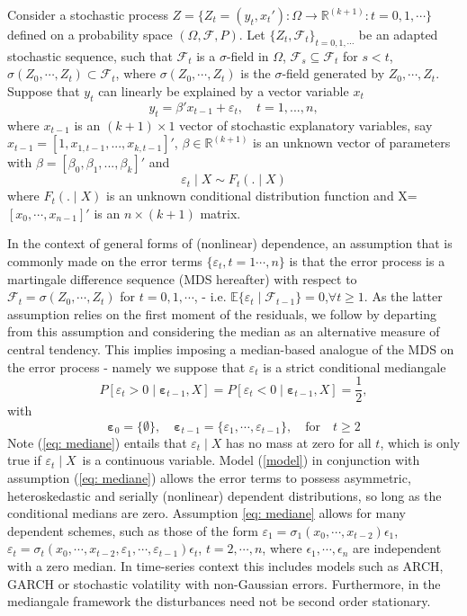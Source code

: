 \documentclass[harvard,11pt]{article}
\newcommand{\R}{\mathbb{R}}
\newcommand{\E}{\mathbb{E}}
\begin{document}
 Consider a stochastic process $Z=\{Z_t=(y_t,x_{t}'):\Omega\rightarrow\R^{(k+1)}:t=0,1,\cdots\}$ defined on a probability space $(\Omega,\mathcal{F},P)$. Let $\{Z_t,\mathcal{F}_t\}_{t=0,1,\cdots}$ be an adapted stochastic sequence, such that $\mathcal{F}_t$ is a $\sigma$-field in $\Omega$, $\mathcal{F}_s\subseteq \mathcal{F}_t$ for $s< t$, $\sigma(Z_0,\cdots,Z_t)\subset \mathcal{F}_t$, where $\sigma(Z_0,\cdots,Z_t)$ is the $\sigma$-field generated by $Z_0,\cdots,Z_t$. Suppose that $y_{t}$ can linearly be explained by a vector variable $x_{t}$%
\begin{equation}
y_{t}=\beta'x_{t-1}+\varepsilon_{t},\quad t=1,...,n,  \label{model}
\end{equation}%
where $x_{t-1}$ is an $(k+1)\times 1$ vector of stochastic explanatory 
variables, say $x_{t-1}=[1,x_{1,t-1},...,x_{k,t-1}]'$, $\beta \in \mathbb{R}^{(k+1)}$ is an unknown vector of parameters with $\beta=[\beta_0,\beta_1,...,\beta_k]'$ and
\[
 \varepsilon_t\mid X\sim F_t(.\mid X)
\] 
where $F_{t}(.\mid X)$ is an unknown conditional distribution function and X=$[x_0,\cdots,x_{n-1}]'$ is an $n\times (k+1)$ matrix. 

In the context of general forms of (nonlinear) dependence, an assumption that is commonly made on the error terms $\{\varepsilon_t,t=1\cdots,n\}$ is that the error process is a martingale difference sequence (MDS hereafter) with respect to $\mathcal{F}_t=\sigma(Z_0,\cdots,Z_t)$ for $t=0,1,\cdots$, - i.e. $\E\{\varepsilon_t\mid \mathcal{F}_{t-1}\}=0$,\quad $\forall t\geq1$. As the latter assumption relies on the first moment of the residuals, we follow \citet{coudin2009finite} by departing from this assumption and considering the median as an alternative measure of central tendency. This implies imposing a median-based analogue of the MDS on the error process - namely we suppose that $\varepsilon_t$ is a strict conditional mediangale
\begin{equation}
P[\varepsilon_{t}> 0\mid \bm{{\varepsilon}}_{t-1},X]=P[\varepsilon_{t}<0\mid \bm{\varepsilon}_{t-1},X]=\frac{1}{2},
\label{eq: mediane}
\end{equation}%
with
\[
\bm{\varepsilon}_{0}=\{\emptyset\},\quad\bm{\varepsilon}_{t-1}=\{\varepsilon_1,\cdots,\varepsilon_{t-1}\},\quad\text{for}\quad t\geq2
\]
 Note (\ref{eq: mediane}) entails
that $\varepsilon _{t}\mid X$ has no mass at zero for all $t$, which is only true if $\varepsilon_{t}\mid X$\ is a
continuous variable. Model (\ref{model}) in conjunction with assumption (\ref{eq: mediane}) allows the error terms to possess asymmetric, heteroskedastic and serially (nonlinear) dependent distributions, so long as the conditional medians are zero. Assumption \ref{eq: mediane} allows for many dependent schemes, such as those of the form $\varepsilon_1=\sigma_1(x_0,\cdots,x_{t-2})\epsilon_1$, $\varepsilon_t=\sigma_t(x_0,\cdots,x_{t-2},\varepsilon_1,\cdots,\varepsilon_{t-1})\epsilon_t$, $t=2,\cdots,n$, where $\epsilon_1,\cdots,\epsilon_n$ are independent with a zero median. In time-series context this includes models such as ARCH, GARCH or stochastic volatility with non-Gaussian errors. Furthermore, in the mediangale framework the disturbances need not be second order stationary.
 
\end{document}

